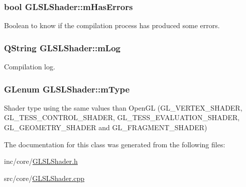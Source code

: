 \hypertarget{class_g_l_s_l_shader_af59206917b6cb53b26f1100eff9069ae}{
\subsubsection[{m\+Has\+Errors}]{\setlength{\rightskip}{0pt plus 5cm}bool G\+L\+S\+L\+Shader\+::m\+Has\+Errors\hspace{0.3cm}{\ttfamily [private]}}}\label{class_g_l_s_l_shader_af59206917b6cb53b26f1100eff9069ae}


Boolean to know if the compilation process has produced some errors. 

\hypertarget{class_g_l_s_l_shader_a617a470477725b8b953da143cb2091fa}{
\subsubsection[{m\+Log}]{\setlength{\rightskip}{0pt plus 5cm}Q\+String G\+L\+S\+L\+Shader\+::m\+Log\hspace{0.3cm}{\ttfamily [private]}}}\label{class_g_l_s_l_shader_a617a470477725b8b953da143cb2091fa}


Compilation log. 

\hypertarget{class_g_l_s_l_shader_ac781a779992807267591d0a549e61fe0}{
\subsubsection[{m\+Type}]{\setlength{\rightskip}{0pt plus 5cm}G\+Lenum G\+L\+S\+L\+Shader\+::m\+Type\hspace{0.3cm}{\ttfamily [private]}}}\label{class_g_l_s_l_shader_ac781a779992807267591d0a549e61fe0}
Shader type using the same values than Open\+G\+L (G\+L\+\_\+\+V\+E\+R\+T\+E\+X\+\_\+\+S\+H\+A\+D\+E\+R, G\+L\+\_\+\+T\+E\+S\+S\+\_\+\+C\+O\+N\+T\+R\+O\+L\+\_\+\+S\+H\+A\+D\+E\+R, G\+L\+\_\+\+T\+E\+S\+S\+\_\+\+E\+V\+A\+L\+U\+A\+T\+I\+O\+N\+\_\+\+S\+H\+A\+D\+E\+R, G\+L\+\_\+\+G\+E\+O\+M\+E\+T\+R\+Y\+\_\+\+S\+H\+A\+D\+E\+R and G\+L\+\_\+\+F\+R\+A\+G\+M\+E\+N\+T\+\_\+\+S\+H\+A\+D\+E\+R) 

The documentation for this class was generated from the following files\+:\begin{DoxyCompactItemize}
\item 
inc/core/\hyperlink{_g_l_s_l_shader_8h}{G\+L\+S\+L\+Shader.\+h}\item 
src/core/\hyperlink{_g_l_s_l_shader_8cpp}{G\+L\+S\+L\+Shader.\+cpp}\end{DoxyCompactItemize}

